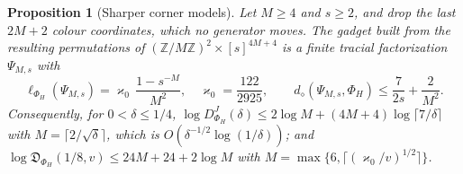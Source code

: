 \documentclass[11pt,a4paper]{article}
\theoremstyle{plain}
\newtheorem{proposition}[theorem]{Proposition}
\theoremstyle{definition}
\theoremstyle{remark}
\newcommand{\DChoi}{D^{J}}
\newcommand{\ddia}{d_\diamond}
\newcommand{\Dsupp}{\mathfrak{D}}
\begin{document}
\begin{proposition}[Sharper corner models]\label{prop:corner-sharp}
Let $M\ge4$ and $s\ge2$, and drop the last $2M+2$ colour coordinates, which no generator moves. The gadget built from the resulting
permutations of $(\mathbb Z/M\mathbb Z)^2\times[s]^{4M+4}$ is a finite tracial factorization $\Psi_{M,s}$ with
\[
\ell_{\Phi_H}(\Psi_{M,s})=\varkappa_0\,\frac{1-s^{-M}}{M^2},\quad\varkappa_0=\frac{122}{2925},\qquad
\ddia(\Psi_{M,s},\Phi_H)\le\frac7{2s}+\frac2{M^2}.
\]
Consequently, for $0<\delta\le1/4$, $\log\DChoi_{\Phi_H}(\delta)\le2\log M+(4M+4)\log\lceil7/\delta\rceil$ with $M=\lceil2/\sqrt\delta\rceil$,
which is $O(\delta^{-1/2}\log(1/\delta))$; and $\log\Dsupp_{\Phi_H}(1/8,v)\le24M+24+2\log M$ with $M=\max\{6,\lceil(\varkappa_0/v)^{1/2}\rceil\}$.
\end{proposition}
\end{document}
